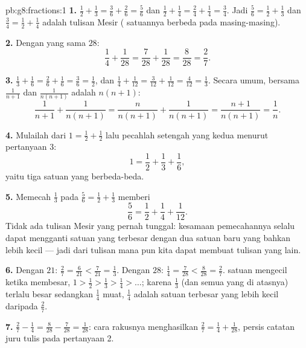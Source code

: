 \begin{solution}{pb:g8:fractions:1}
\textbf{1.} $\frac12 + \frac13 = \frac36 + \frac26 = \frac56$ dan
$\frac12 + \frac14 = \frac24 + \frac14 = \frac34$. Jadi
$\frac56 = \frac12 + \frac13$ dan $\frac34 = \frac12 + \frac14$
adalah tulisan Mesir ( satuannya berbeda pada masing-masing).

\textbf{2.} Dengan  yang sama $28$:
\[
\frac14 + \frac{1}{28} = \frac{7}{28} + \frac{1}{28}
= \frac{8}{28} = \frac{2}{7} .
\]

\textbf{3.} $\frac13 + \frac16 = \frac26 + \frac16 = \frac36 =
\frac12$, dan $\frac14 + \frac{1}{12} = \frac{3}{12} +
\frac{1}{12} = \frac{4}{12} = \frac13$. Secara umum, 
bersama $\frac{1}{n+1}$ dan $\frac{1}{n(n+1)}$ adalah
$n(n+1)$:
\[
\frac{1}{n+1} + \frac{1}{n(n+1)}
= \frac{n}{n(n+1)} + \frac{1}{n(n+1)}
= \frac{n+1}{n(n+1)}
= \frac{1}{n} .
\]

\textbf{4.} Mulailah dari $1 = \frac12 + \frac12$ lalu pecahlah
setengah yang kedua menurut pertanyaan 3:
\[
1 = \frac12 + \frac13 + \frac16 ,
\]
yaitu tiga  satuan yang berbeda-beda.

\textbf{5.} Memecah $\frac13$ pada $\frac56 = \frac12 +
\frac13$ memberi
\[
\frac56 = \frac12 + \frac14 + \frac{1}{12} .
\]
Tidak ada tulisan Mesir yang pernah tunggal: kesamaan pemecahannya
selalu dapat mengganti  satuan yang  terbesar
dengan dua  satuan baru yang bahkan lebih kecil --- jadi dari
tulisan mana pun kita dapat membuat tulisan yang lain.

\textbf{6.} Dengan  $21$: $\frac27 = \frac{6}{21} <
\frac{7}{21} = \frac13$. Dengan  $28$: $\frac14 =
\frac{7}{28} < \frac{8}{28} = \frac27$.  satuan mengecil
ketika  membesar, $1 > \frac12 > \frac13 > \frac14 >
\dots$; karena $\frac13$ (dan semua yang di atasnya) terlalu besar
sedangkan $\frac14$ muat, $\frac14$ adalah  satuan terbesar
yang lebih kecil daripada $\frac27$.

\textbf{7.} $\frac27 - \frac14 = \frac{8}{28} - \frac{7}{28} =
\frac{1}{28}$: cara rakusnya menghasilkan
$\frac27 = \frac14 + \frac{1}{28}$, persis catatan juru tulis pada
pertanyaan 2.


\end{solution}

